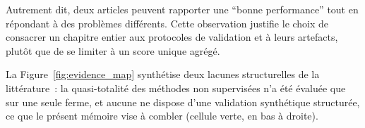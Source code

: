 Autrement dit, deux articles peuvent rapporter une ``bonne performance'' tout en répondant à
des problèmes différents. Cette observation justifie le choix de consacrer un chapitre entier
aux protocoles de validation et à leurs artefacts, plutôt que de se limiter à un score unique
agrégé.

La Figure~\ref{fig:evidence_map} synthétise deux lacunes structurelles de la littérature~:
la quasi-totalité des méthodes non supervisées n'a été évaluée que sur une seule ferme, et
aucune ne dispose d'une validation synthétique structurée, ce que le présent mémoire vise à
combler (cellule verte, en bas à droite).

